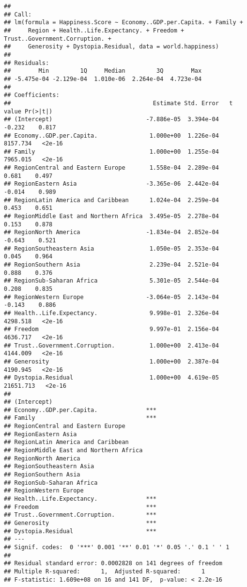 \documentclass[
]{article}
\begin{document}
\begin{verbatim}
## 
## Call:
## lm(formula = Happiness.Score ~ Economy..GDP.per.Capita. + Family + 
##     Region + Health..Life.Expectancy. + Freedom + Trust..Government.Corruption. + 
##     Generosity + Dystopia.Residual, data = world.happiness)
## 
## Residuals:
##        Min         1Q     Median         3Q        Max 
## -5.475e-04 -2.129e-04  1.010e-06  2.264e-04  4.723e-04 
## 
## Coefficients:
##                                         Estimate Std. Error   t value Pr(>|t|)
## (Intercept)                           -7.886e-05  3.394e-04    -0.232    0.817
## Economy..GDP.per.Capita.               1.000e+00  1.226e-04  8157.734   <2e-16
## Family                                 1.000e+00  1.255e-04  7965.015   <2e-16
## RegionCentral and Eastern Europe       1.558e-04  2.289e-04     0.681    0.497
## RegionEastern Asia                    -3.365e-06  2.442e-04    -0.014    0.989
## RegionLatin America and Caribbean      1.024e-04  2.259e-04     0.453    0.651
## RegionMiddle East and Northern Africa  3.495e-05  2.278e-04     0.153    0.878
## RegionNorth America                   -1.834e-04  2.852e-04    -0.643    0.521
## RegionSoutheastern Asia                1.050e-05  2.353e-04     0.045    0.964
## RegionSouthern Asia                    2.239e-04  2.521e-04     0.888    0.376
## RegionSub-Saharan Africa               5.301e-05  2.544e-04     0.208    0.835
## RegionWestern Europe                  -3.064e-05  2.143e-04    -0.143    0.886
## Health..Life.Expectancy.               9.998e-01  2.326e-04  4298.518   <2e-16
## Freedom                                9.997e-01  2.156e-04  4636.717   <2e-16
## Trust..Government.Corruption.          1.000e+00  2.413e-04  4144.009   <2e-16
## Generosity                             1.000e+00  2.387e-04  4190.945   <2e-16
## Dystopia.Residual                      1.000e+00  4.619e-05 21651.713   <2e-16
##                                          
## (Intercept)                              
## Economy..GDP.per.Capita.              ***
## Family                                ***
## RegionCentral and Eastern Europe         
## RegionEastern Asia                       
## RegionLatin America and Caribbean        
## RegionMiddle East and Northern Africa    
## RegionNorth America                      
## RegionSoutheastern Asia                  
## RegionSouthern Asia                      
## RegionSub-Saharan Africa                 
## RegionWestern Europe                     
## Health..Life.Expectancy.              ***
## Freedom                               ***
## Trust..Government.Corruption.         ***
## Generosity                            ***
## Dystopia.Residual                     ***
## ---
## Signif. codes:  0 '***' 0.001 '**' 0.01 '*' 0.05 '.' 0.1 ' ' 1
## 
## Residual standard error: 0.0002828 on 141 degrees of freedom
## Multiple R-squared:      1,  Adjusted R-squared:      1 
## F-statistic: 1.609e+08 on 16 and 141 DF,  p-value: < 2.2e-16
\end{verbatim}
\end{document}
